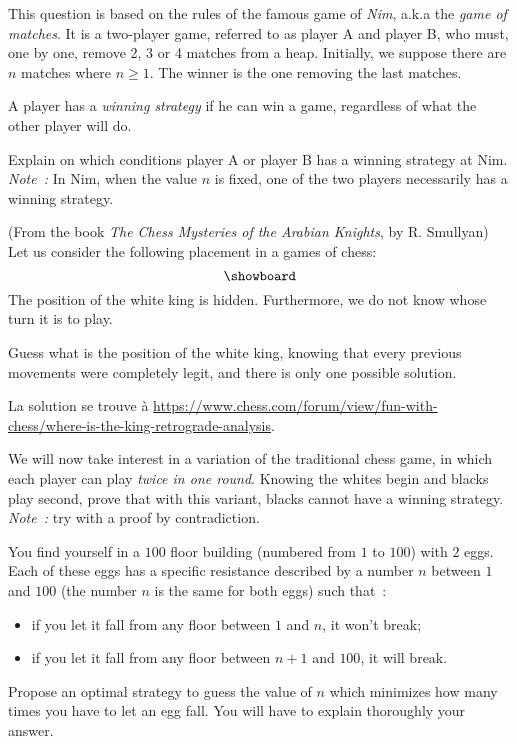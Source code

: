 \documentclass[12pt,addpoints]{exam}
\begin{document}
\begin{questions}
\question
This question is based on the rules of the famous game of \emph{Nim}, a.k.a the \emph{game of matches}.
It is a two-player game, referred to as player A and player B, who must, one by one, remove 2, 3 or 4 matches from a heap.
Initially, we suppose there are $n$ matches where $n \geq 1$. The winner is the one removing the last matches.

A player has a \emph{winning strategy} if he can win a game, regardless of what the other player will do.

Explain on which conditions player A or player B has a winning strategy at Nim. \emph{Note~:} In Nim, when the value $n$ is fixed, one of the two players necessarily has a winning strategy.

\question
(From the book \emph{The Chess Mysteries of the Arabian Knights}, by R. Smullyan) Let us consider the following placement in a games of chess:
\[ \showboard \]
The position of the white king is hidden. Furthermore, we do not know whose turn it is to play.

Guess what is the position of the white king, knowing that every previous movements were completely legit, and there is only one possible solution.
\begin{solution}
La solution se trouve à \href{https://www.chess.com/forum/view/fun-with-chess/where-is-the-king-retrograde-analysis}{https://www.chess.com/forum/view/fun-with-chess/where-is-the-king-retrograde-analysis}.
\end{solution}

\question
We will now take interest in a variation of the traditional chess game, in which each player can play \emph{twice in one round}.
Knowing the whites begin and blacks play second, prove that with this variant, blacks cannot have a winning strategy.
\emph{Note~:} try with a proof by contradiction.

\question
You find yourself in a $100$ floor building (numbered from $1$ to $100$) with $2$ eggs.
Each of these eggs has a specific resistance described by a number $n$ between $1$ and $100$ (the number $n$ is the same for both eggs) such that~:
\begin{itemize}
  \item if you let it fall from any floor between $1$ and $n$, it won't break;
  \item if you let it fall from any floor between $n + 1$ and $100$, it will break.
\end{itemize}
Propose an optimal strategy to guess the value of $n$ which minimizes how many times you have to let an egg fall. You will have to explain thoroughly your answer.


\end{questions}
\end{document}
